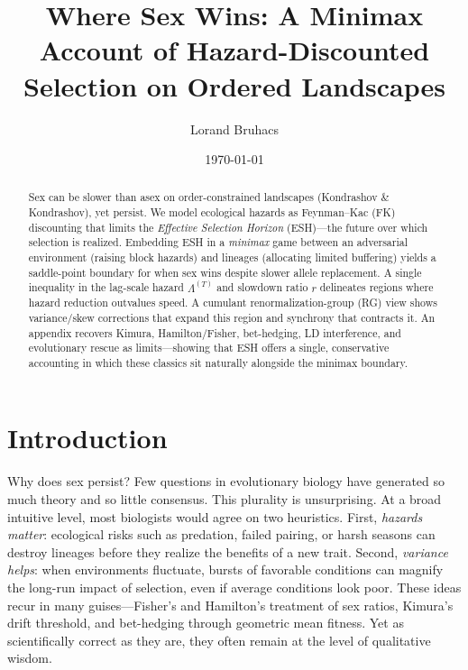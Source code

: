 \documentclass[11pt]{article}
\title{Where Sex Wins: A Minimax Account of Hazard-Discounted Selection on Ordered Landscapes}
\author{\normalsize Lorand Bruhacs}
\date{\normalsize \today}
\theoremstyle{upright}
\newcommand{\horizon}{\Lambda}
\begin{document}
\maketitle

\begin{abstract}
Sex can be slower than asex on order-constrained landscapes (Kondrashov \& Kondrashov), yet persist. We model ecological hazards as Feynman--Kac (FK) discounting that limits the \emph{Effective Selection Horizon} (ESH)---the future over which selection is realized. Embedding ESH in a \emph{minimax} game between an adversarial environment (raising block hazards) and lineages (allocating limited buffering) yields a saddle-point boundary for when sex wins despite slower allele replacement. A single inequality in the lag-scale hazard $\horizon^{(T)}$ and slowdown ratio $r$ delineates regions where hazard reduction outvalues speed. A cumulant renormalization-group (RG) view shows variance/skew corrections that expand this region and synchrony that contracts it. An appendix recovers Kimura, Hamilton/Fisher, bet-hedging, LD interference, and evolutionary rescue as limits—showing that ESH offers a single, conservative accounting in which these classics sit naturally alongside the minimax boundary.
\end{abstract}

\tableofcontents

\section{Introduction}
\label{sec:intro}

Why does sex persist? Few questions in evolutionary biology have generated so
much theory and so little consensus. This plurality is unsurprising. At a broad intuitive level, most biologists
would agree on two heuristics. First, \emph{hazards matter}: ecological risks
such as predation, failed pairing, or harsh seasons can destroy lineages before
they realize the benefits of a new trait. Second, \emph{variance helps}: when
environments fluctuate, bursts of favorable conditions can magnify the long-run
impact of selection, even if average conditions look poor. These ideas recur in
many guises---Fisher’s and Hamilton’s treatment of sex ratios, Kimura’s drift
threshold, and bet-hedging through geometric mean fitness. Yet as scientifically
correct as they are, they often remain at the level of qualitative wisdom.
\end{document}

